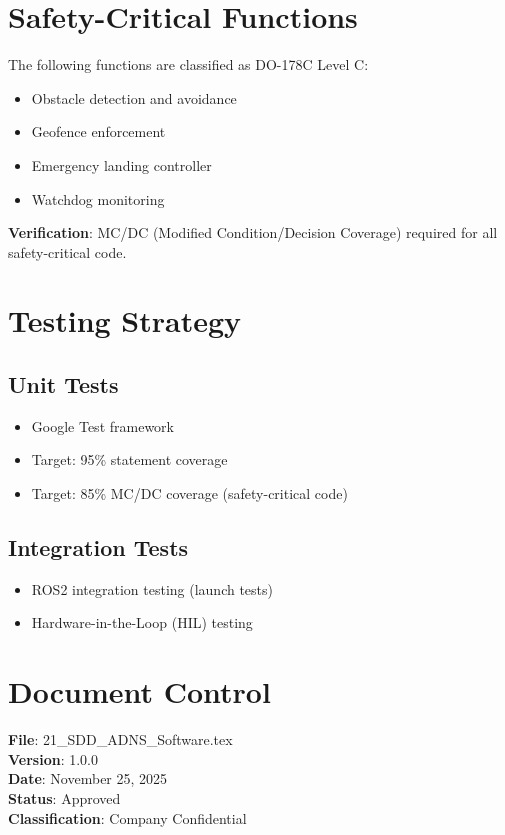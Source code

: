 \documentclass[11pt,a4paper]{article}
\begin{document}
\section{Safety-Critical Functions}

The following functions are classified as DO-178C Level C:

\begin{itemize}
    \item Obstacle detection and avoidance
    \item Geofence enforcement
    \item Emergency landing controller
    \item Watchdog monitoring
\end{itemize}

\textbf{Verification}: MC/DC (Modified Condition/Decision Coverage) required for all safety-critical code.

\section{Testing Strategy}

\subsection{Unit Tests}

\begin{itemize}
    \item Google Test framework
    \item Target: 95\% statement coverage
    \item Target: 85\% MC/DC coverage (safety-critical code)
\end{itemize}

\subsection{Integration Tests}

\begin{itemize}
    \item ROS2 integration testing (launch tests)
    \item Hardware-in-the-Loop (HIL) testing
\end{itemize}

\section{Document Control}

\textbf{File}: 21\_SDD\_ADNS\_Software.tex \\
\textbf{Version}: 1.0.0 \\
\textbf{Date}: November 25, 2025 \\
\textbf{Status}: Approved \\
\textbf{Classification}: Company Confidential
\end{document}
